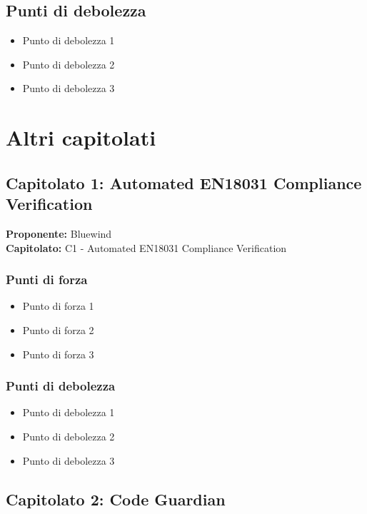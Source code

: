 \documentclass[a4paper,12pt]{article}
\begin{document}
\subsection{Punti di debolezza}
\begin{itemize}
\item Punto di debolezza 1
\item Punto di debolezza 2
\item Punto di debolezza 3
\end{itemize}

\newpage

\section{Altri capitolati}

\subsection{Capitolato 1: Automated EN18031 Compliance Verification}

\begin{tcolorbox}[colback=lightgray!30,colframe=darkgray,arc=2mm,boxrule=0.3pt]
\textbf{Proponente:} Bluewind \\
\textbf{Capitolato:} C1 - Automated EN18031 Compliance Verification
\end{tcolorbox}

\subsubsection{Punti di forza}
\begin{itemize}
\item Punto di forza 1
\item Punto di forza 2
\item Punto di forza 3
\end{itemize}

\subsubsection{Punti di debolezza}
\begin{itemize}
\item Punto di debolezza 1
\item Punto di debolezza 2
\item Punto di debolezza 3
\end{itemize}

\subsection{Capitolato 2: Code Guardian}
\end{document}
